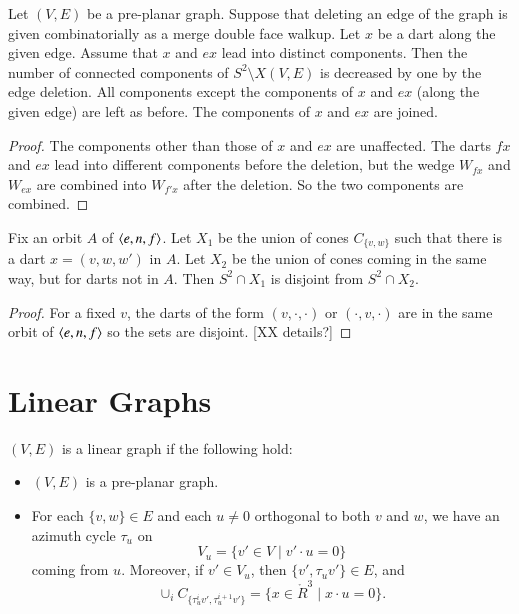 \begin{lemma} Let $(V,E)$ be a pre-planar graph.  Suppose that
deleting an edge of the graph is given combinatorially as a merge
double face walkup.  Let $x$ be a dart along the given edge.  Assume
that $x$ and $e x$ lead into distinct components. Then the number of
connected components of $S^2\setminus X(V,E)$ is decreased by one by
the edge deletion. All components except the components of $x$ and
$e x$ (along the given edge) are left as before.  The components of
$x$ and $e x$ are joined.
\end{lemma}

\begin{proof} The components other than those of $x$ and $e x$ are
unaffected.  The darts $f x$ and $e x$ lead into different
components before the deletion, but the wedge $W_{f x}$ and $W_{e
x}$ are combined into $W_{f' x}$ after the deletion.  So the two
components are combined.
\end{proof}

\begin{lemma}  Fix an orbit $A$ of $\langle e,n,f\rangle$.  Let $X_1$ be
the union of cones $C_{\{v,w\}}$ such that there is a dart $x =
(v,w,w')$ in $A$.  Let $X_2$ be the union of cones coming in the
same way, but for darts not in $A$.  Then $S^2\cap X_1$ is disjoint
from $S^2\cap X_2$.
\end{lemma}

\begin{proof} For a fixed $v$, the darts of
the form $(v,\cdot,\cdot)$ or $(\cdot,v,\cdot)$ are in the same
orbit of $\langle e,n,f\rangle$ so the sets are disjoint. [XX details?]
\end{proof}



\section{Linear Graphs}


\begin{definition}
  $(V,E)$ is a linear graph if the following hold:
  \begin{itemize}
  \item $(V,E)$ is a pre-planar graph.
  \item For each $\{v,w\}\in E$ and each $u\ne0$ orthogonal to both
  $v$ and $w$, we have an azimuth cycle $\tau_u$ on
    $$V_u = \{ v' \in V \mid v'\cdot u = 0\}$$
    coming from $u$.  Moreover, if $v'\in V_u$, then $\{v',\tau_u
    v'\}\in E$, and
    $$\cup_{i} C_{\{\tau_u^i v',\tau_u^{i+1} v'\}} = \{x \in \ring{R}^3\mid
    x\cdot u = 0\}.$$
  \end{itemize}
\end{definition}

